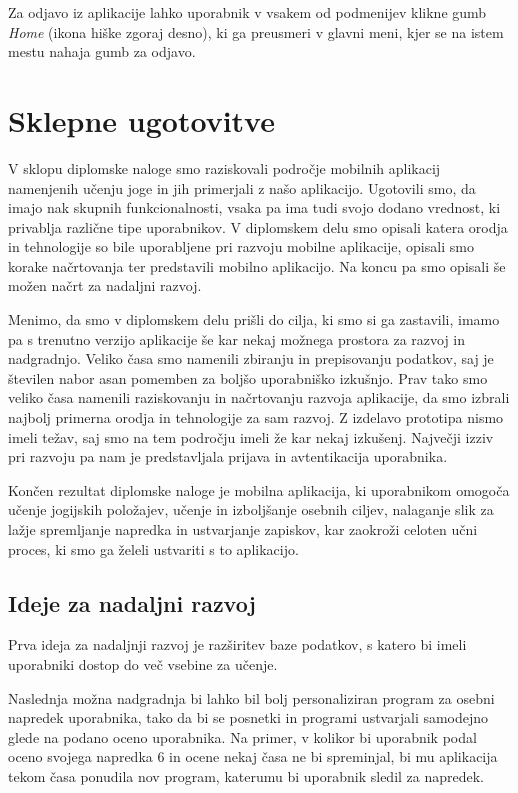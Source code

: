 \documentclass[a4paper, 12pt]{book}
\begin{document}
Za odjavo iz aplikacije lahko uporabnik v vsakem od podmenijev klikne gumb  \textit{Home}  (ikona hiške zgoraj desno), ki ga preusmeri v glavni meni, kjer se na istem mestu nahaja gumb za odjavo.

\chapter{Sklepne ugotovitve}
\label{stroka}

V sklopu diplomske naloge smo raziskovali področje mobilnih aplikacij namenjenih učenju joge in jih primerjali z našo aplikacijo. Ugotovili smo, da imajo nak skupnih funkcionalnosti, vsaka pa ima tudi svojo dodano vrednost, ki privablja različne tipe uporabnikov. V diplomskem delu smo opisali katera orodja in tehnologije so bile uporabljene pri razvoju mobilne aplikacije, opisali smo korake načrtovanja ter predstavili mobilno aplikacijo. Na koncu pa smo opisali še možen načrt za nadaljni razvoj. 

Menimo, da smo v diplomskem delu prišli do cilja, ki smo si ga zastavili, imamo pa s trenutno verzijo aplikacije še kar nekaj možnega prostora za razvoj in nadgradnjo. Veliko časa smo namenili zbiranju in prepisovanju podatkov, saj je številen nabor asan pomemben za boljšo uporabniško izkušnjo. Prav tako smo veliko časa namenili raziskovanju in načrtovanju razvoja aplikacije, da smo izbrali najbolj primerna orodja in tehnologije za sam razvoj. Z izdelavo prototipa nismo imeli težav, saj smo na tem področju imeli že kar nekaj izkušenj. Največji izziv pri razvoju pa nam je predstavljala prijava in avtentikacija uporabnika. 

Končen rezultat diplomske naloge je mobilna aplikacija, ki uporabnikom omogoča učenje jogijskih položajev, učenje in izboljšanje osebnih ciljev, nalaganje slik za lažje spremljanje napredka in ustvarjanje zapiskov, kar zaokroži celoten učni proces, ki smo ga želeli ustvariti s to aplikacijo.


\section{Ideje za nadaljni razvoj}
Prva ideja za nadaljnji razvoj je razširitev baze podatkov, s katero bi imeli uporabniki dostop do več vsebine za učenje.

Naslednja možna nadgradnja bi lahko bil bolj personaliziran program za osebni napredek uporabnika, tako da bi se posnetki in programi ustvarjali samodejno glede na podano oceno uporabnika. Na primer, v kolikor bi uporabnik podal oceno svojega napredka 6 in ocene nekaj časa ne bi spreminjal, bi mu aplikacija tekom časa ponudila nov program, katerumu bi uporabnik sledil za napredek. 
\end{document}
